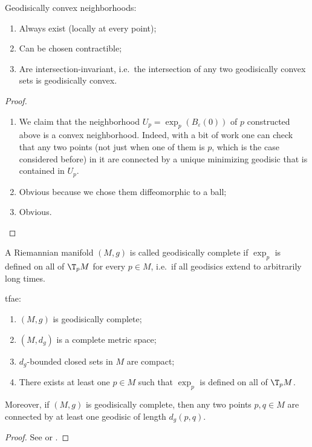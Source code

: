 \begin{thm}\label{geodisically convex nbhds thm}
    Geodisically convex neighborhoods:
    \begin{enumerate}
        \item Always exist (locally at every point);
        \item Can be chosen contractible;
        \item Are intersection-invariant, i.e.\ the intersection of any two geodisically convex sets is geodisically convex.
    \end{enumerate}
\end{thm}
\begin{proof}
    \begin{enumerate}
        \item We claim that the neighborhood $U_p=\exp_p(B_\varepsilon(0))$ of $p$ constructed above is a convex neighborhood. Indeed, with a bit of work one can check that any two points (not just when one of them is $p$, which is the case considered before) in it are connected by a unique minimizing geodisic that is contained in $U_p$.
        \item Obvious because we chose them diffeomorphic to a ball;
        \item Obvious.
    \end{enumerate}
\end{proof}


\begin{defn}
    A Riemannian manifold $(M,g)$ is called geodisically complete if $\exp_p$ is defined on all of $\T_pM$ for every $p\in M$, i.e.\ if all geodisics extend to arbitrarily long times.
\end{defn}

\begin{thm}
    \gls{tfae}:
    \begin{enumerate}
        \item $(M,g)$ is geodisically complete;
        \item $(M,d_g)$ is a complete metric space;
        \item $d_g$-bounded closed sets in $M$ are compact;
        \item There exists at least one $p\in M$ such that $\exp_p$ is defined on all of $\T_p M$.
    \end{enumerate}
    Moreover, if $(M,g)$ is geodisically complete, then any two points $p,q\in M$ are connected by at least one geodisic of length $d_g(p,q)$.
\end{thm}
\begin{proof}
    See \cite[Thm. 1.7.1]{Jost} or \cite[Thm. 10.9]{Milnor}.
\end{proof}



